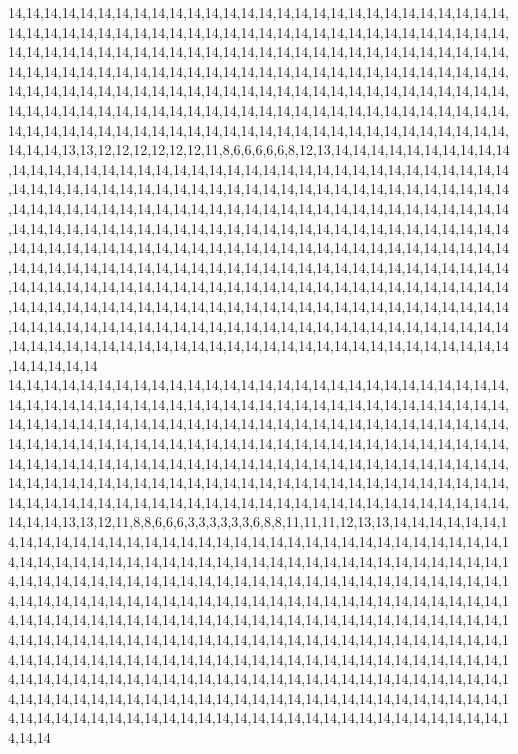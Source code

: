 14,14,14,14,14,14,14,14,14,14,14,14,14,14,14,14,14,14,14,14,14,14,14,14,14,14,14,14,14,14,14,14,14,14,14,14,14,14,14,14,14,14,14,14,14,14,14,14,14,14,14,14,14,14,14,14,14,14,14,14,14,14,14,14,14,14,14,14,14,14,14,14,14,14,14,14,14,14,14,14,14,14,14,14,14,14,14,14,14,14,14,14,14,14,14,14,14,14,14,14,14,14,14,14,14,14,14,14,14,14,14,14,14,14,14,14,14,14,14,14,14,14,14,14,14,14,14,14,14,14,14,14,14,14,14,14,14,14,14,14,14,14,14,14,14,14,14,14,14,14,14,14,14,14,14,14,14,14,14,14,14,14,14,14,14,14,14,14,14,14,14,14,14,14,14,14,14,14,14,14,14,14,14,14,14,14,14,14,14,14,14,14,14,14,14,14,14,14,14,13,13,12,12,12,12,12,12,11,8,6,6,6,6,6,8,12,13,14,14,14,14,14,14,14,14,14,14,14,14,14,14,14,14,14,14,14,14,14,14,14,14,14,14,14,14,14,14,14,14,14,14,14,14,14,14,14,14,14,14,14,14,14,14,14,14,14,14,14,14,14,14,14,14,14,14,14,14,14,14,14,14,14,14,14,14,14,14,14,14,14,14,14,14,14,14,14,14,14,14,14,14,14,14,14,14,14,14,14,14,14,14,14,14,14,14,14,14,14,14,14,14,14,14,14,14,14,14,14,14,14,14,14,14,14,14,14,14,14,14,14,14,14,14,14,14,14,14,14,14,14,14,14,14,14,14,14,14,14,14,14,14,14,14,14,14,14,14,14,14,14,14,14,14,14,14,14,14,14,14,14,14,14,14,14,14,14,14,14,14,14,14,14,14,14,14,14,14,14,14,14,14,14,14,14,14,14,14,14,14,14,14,14,14,14,14,14,14,14,14,14,14,14,14,14,14,14,14,14,14,14,14,14,14,14,14,14,14,14,14,14,14,14,14,14,14,14,14,14,14,14,14,14,14,14,14,14,14,14,14,14,14,14,14,14,14,14,14,14,14,14,14,14,14,14,14,14,14,14,14,14,14,14,14,14,14,14,14,14,14,14,14,14,14,14,14,14,14,14,14,14,14,14,14,14,14,14,14,14,14,14,14,14
14,14,14,14,14,14,14,14,14,14,14,14,14,14,14,14,14,14,14,14,14,14,14,14,14,14,14,14,14,14,14,14,14,14,14,14,14,14,14,14,14,14,14,14,14,14,14,14,14,14,14,14,14,14,14,14,14,14,14,14,14,14,14,14,14,14,14,14,14,14,14,14,14,14,14,14,14,14,14,14,14,14,14,14,14,14,14,14,14,14,14,14,14,14,14,14,14,14,14,14,14,14,14,14,14,14,14,14,14,14,14,14,14,14,14,14,14,14,14,14,14,14,14,14,14,14,14,14,14,14,14,14,14,14,14,14,14,14,14,14,14,14,14,14,14,14,14,14,14,14,14,14,14,14,14,14,14,14,14,14,14,14,14,14,14,14,14,14,14,14,14,14,14,14,14,14,14,14,14,14,14,14,14,14,14,14,14,14,14,14,14,14,14,14,14,14,14,14,14,13,13,12,11,8,8,6,6,6,3,3,3,3,3,3,6,8,8,11,11,11,12,13,13,14,14,14,14,14,14,14,14,14,14,14,14,14,14,14,14,14,14,14,14,14,14,14,14,14,14,14,14,14,14,14,14,14,14,14,14,14,14,14,14,14,14,14,14,14,14,14,14,14,14,14,14,14,14,14,14,14,14,14,14,14,14,14,14,14,14,14,14,14,14,14,14,14,14,14,14,14,14,14,14,14,14,14,14,14,14,14,14,14,14,14,14,14,14,14,14,14,14,14,14,14,14,14,14,14,14,14,14,14,14,14,14,14,14,14,14,14,14,14,14,14,14,14,14,14,14,14,14,14,14,14,14,14,14,14,14,14,14,14,14,14,14,14,14,14,14,14,14,14,14,14,14,14,14,14,14,14,14,14,14,14,14,14,14,14,14,14,14,14,14,14,14,14,14,14,14,14,14,14,14,14,14,14,14,14,14,14,14,14,14,14,14,14,14,14,14,14,14,14,14,14,14,14,14,14,14,14,14,14,14,14,14,14,14,14,14,14,14,14,14,14,14,14,14,14,14,14,14,14,14,14,14,14,14,14,14,14,14,14,14,14,14,14,14,14,14,14,14,14,14,14,14,14,14,14,14,14,14,14,14,14,14,14,14,14,14,14,14,14,14,14,14,14,14,14,14,14,14,14,14,14,14,14,14,14,14,14,14,14
